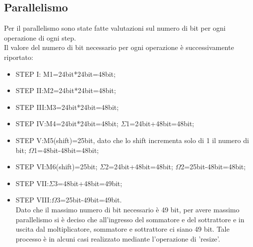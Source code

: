 \documentclass[a4paper, titlepage]{article}
\begin{document}
\subsection{Parallelismo}%
Per il parallelismo sono state fatte valutazioni sul numero di bit per ogni operazione di ogni step.\\
Il valore del numero di bit necessario per ogni operazione è successivamente riportato:
\begin{itemize}
\item STEP I: M1=24bit*24bit=48bit;
\item STEP II:M2=24bit*24bit=48bit;
\item STEP III:M3=24bit*24bit=48bit;
\item STEP IV:M4=24bit*24bit=48bit; $\Sigma$1=24bit+48bit=48bit;
\item STEP V:M5(shift)=25bit, dato che lo shift incrementa solo di 1 il numero di bit; $\Omega$1=48bit-48bit=48bit;
\item STEP VI:M6(shift)=25bit; $\Sigma$2=24bit+48bit=48bit; $\Omega$2=25bit-48bit=48bit;
\item STEP VII:$\Sigma$3=48bit+48bit=49bit;
\item STEP VIII:$\Omega$3=25bit-49bit=49bit.
\\Dato che il massimo numero di bit necessario è 49 bit, per avere massimo parallelismo si è deciso che all'ingresso del sommatore e del sottrattore e in uscita dal moltiplicatore, sommatore e sottrattore ci siano 49 bit. Tale processo è in alcuni casi realizzato mediante l'operazione di 'resize'.
\end{itemize}
\newpage
\end{document}
